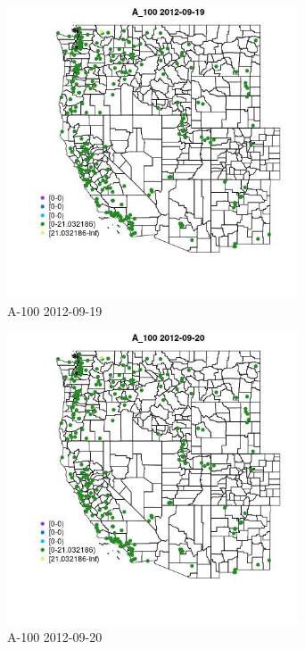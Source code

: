 \begin{figure} 
\centering  
\includegraphics[width=0.77\textwidth]{Code_Outputs/ML_input_report_ML_input_PM25_Step5_part_d_de_duplicated_aves_ML_input_MapObsA_1002012-09-19.jpg} 
\caption{\label{fig:ML_input_report_ML_input_PM25_Step5_part_d_de_duplicated_aves_ML_inputMapObsA_1002012-09-19}A-100 2012-09-19} 
\end{figure} 
 

\begin{figure} 
\centering  
\includegraphics[width=0.77\textwidth]{Code_Outputs/ML_input_report_ML_input_PM25_Step5_part_d_de_duplicated_aves_ML_input_MapObsA_1002012-09-20.jpg} 
\caption{\label{fig:ML_input_report_ML_input_PM25_Step5_part_d_de_duplicated_aves_ML_inputMapObsA_1002012-09-20}A-100 2012-09-20} 
\end{figure} 
 


